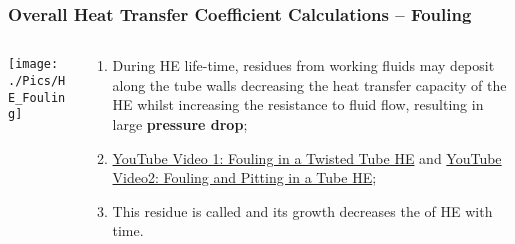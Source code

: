 \documentclass[10pt,compress,unknownkeysallowed]{beamer}
\begin{document}
\begin{frame}
  \frametitle{Overall Heat Transfer Coefficient Calculations -- Fouling}
    \begin{columns}
       \begin{column}[l]{0.5\linewidth}
         \texttt{[image: ./Pics/HE\_Fouling]}
       \end{column}
       \begin{column}[l]{0.4\linewidth}
         \begin{enumerate}\scriptsize
              \item<1-> During HE life-time, residues from working fluids may deposit along the tube walls decreasing the heat transfer capacity of the HE whilst increasing the resistance to fluid flow, resulting in large {\bf pressure drop};
              \item<2-> \href{https://www.youtube.com/watch?v=3G0LoghWx7w}{YouTube Video 1: Fouling in a Twisted Tube HE} and \href{https://www.youtube.com/watch?v=Ss2m8Ockrdg}{YouTube Video2: Fouling and Pitting in a Tube HE};
              \item<3-> This residue is called  and its growth decreases the  of HE with time.
          \end{enumerate}
       \end{column}      
    \end{columns}


\end{frame}
\end{document}
